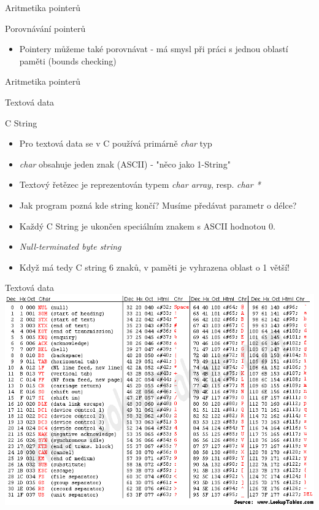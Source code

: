 \documentclass[9pt]{beamer}
\begin{document}
\begin{frame}{Aritmetika pointerů}
    \begin{block}{Porovnávání pointerů}
        \begin{itemize}
            \item Pointery můžeme také porovnávat - má smysl při práci
            s jednou oblastí paměti (bounds checking)
        \end{itemize}
    \end{block}
\end{frame}

\begin{frame}{Aritmetika pointerů}
    
\end{frame}

\begin{frame}{Textová data}
    \begin{block}{C String}
        \begin{itemize}
            \item Pro textová data se v C používá primárně \textit{char} typ
            \item \textit{char} obsahuje jeden znak (ASCII) - "něco jako 1-String"
            \item Textový řetězec je reprezentován typem \textit{char array}, resp. \textit{char *}
            \item Jak program pozná kde string končí? Musíme předávat parametr o délce?
            \pause
            \item Každý C String je ukončen speciálním znakem s ASCII hodnotou 0.
            \item \textit{Null-terminated byte string}
            \item Když má tedy C string 6 znaků, v paměti je vyhrazena oblast o 1 větší!
        \end{itemize}
    \end{block}
    
\end{frame}

\begin{frame}{Textová data}
    \includegraphics[width=0.95\linewidth]{lekce21/asciifull.png}
\end{frame}
\end{document}
